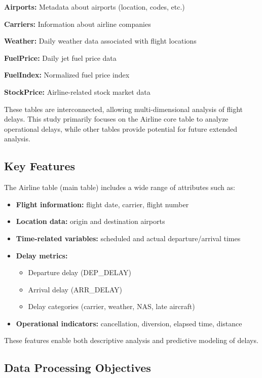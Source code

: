 \documentclass[12pt,a4paper]{report}
\begin{document}
\textbf{Airports:} Metadata about airports (location, codes, etc.)

\textbf{Carriers:} Information about airline companies

\textbf{Weather:} Daily weather data associated with flight locations

\textbf{FuelPrice:} Daily jet fuel price data

\textbf{FuelIndex:} Normalized fuel price index

\textbf{StockPrice:} Airline-related stock market data

These tables are interconnected, allowing multi-dimensional analysis of flight delays. This study primarily focuses on the Airline core table to analyze operational delays, while other tables provide potential for future extended analysis.

\subsection{Key Features}

The Airline table (main table) includes a wide range of attributes such as:

\begin{itemize}
    \item \textbf{Flight information:} flight date, carrier, flight number
    \item \textbf{Location data:} origin and destination airports
    \item \textbf{Time-related variables:} scheduled and actual departure/arrival times
    \item \textbf{Delay metrics:}
    \begin{itemize}
        \item Departure delay (DEP\_DELAY)
        \item Arrival delay (ARR\_DELAY)
        \item Delay categories (carrier, weather, NAS, late aircraft)
    \end{itemize}
    \item \textbf{Operational indicators:} cancellation, diversion, elapsed time, distance
\end{itemize}

These features enable both descriptive analysis and predictive modeling of delays.

\subsection{Data Processing Objectives}
\end{document}
